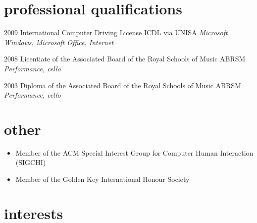 \documentclass[]{friggeri-cv} %
\begin{document}

\section{professional qualifications}

\begin{entrylist}
\entry
{2009}
{International Computer Driving License}
{ICDL via UNISA}
{\emph{Microsoft Windows, Microsoft Office, Internet}}

\entry
{2008}
{Licentiate of the Associated Board of the Royal Schools of Music}
{ABRSM}
{\emph{Performance, cello}}

\entry
{2003}
{Diploma of the Associated Board of the Royal Schools of Music}
{ABRSM}
{\emph{Performance, cello}}

\end{entrylist}


\section{other}
\begin{itemize}
\item Member of the ACM Special Interest Group for Computer Human Interaction (SIGCHI)
\end{itemize}

\begin{itemize}
\item Member of the Golden Key International Honour Society\\
\end{itemize}


\section{interests}
\end{document}
